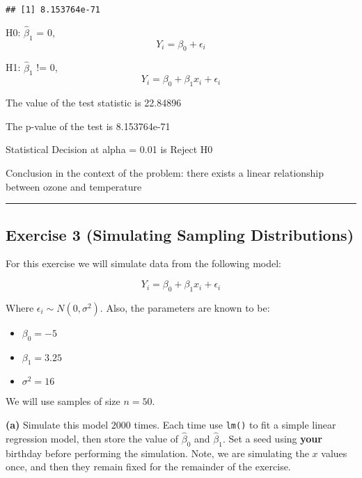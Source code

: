 \documentclass[
]{article}
\providecommand{\tightlist}{%
  \setlength{\itemsep}{0pt}\setlength{\parskip}{0pt}}
\begin{document}
\begin{verbatim}
## [1] 8.153764e-71
\end{verbatim}

H0: \(\hat{\beta}_1\) = 0, \[Y_i = \beta_0 + \epsilon_i\]

H1: \(\hat{\beta}_1\) != 0, \[Y_i = \beta_0 + \beta_1 x_i + \epsilon_i\]

The value of the test statistic is 22.84896

The p-value of the test is 8.153764e-71

Statistical Decision at alpha = 0.01 is Reject H0

Conclusion in the context of the problem: there exists a linear
relationship between ozone and temperature

\begin{center}\rule{0.5\linewidth}{0.5pt}\end{center}

\hypertarget{exercise-3-simulating-sampling-distributions}{%
\subsection{Exercise 3 (Simulating Sampling
Distributions)}\label{exercise-3-simulating-sampling-distributions}}

For this exercise we will simulate data from the following model:

\[
Y_i = \beta_0 + \beta_1 x_i + \epsilon_i
\]

Where \(\epsilon_i \sim N(0, \sigma^2).\) Also, the parameters are known
to be:

\begin{itemize}
\tightlist
\item
  \(\beta_0 = -5\)
\item
  \(\beta_1 = 3.25\)
\item
  \(\sigma^2 = 16\)
\end{itemize}

We will use samples of size \(n = 50\).

\textbf{(a)} Simulate this model \(2000\) times. Each time use
\texttt{lm()} to fit a simple linear regression model, then store the
value of \(\hat{\beta}_0\) and \(\hat{\beta}_1\). Set a seed using
\textbf{your} birthday before performing the simulation. Note, we are
simulating the \(x\) values once, and then they remain fixed for the
remainder of the exercise.
\end{document}
